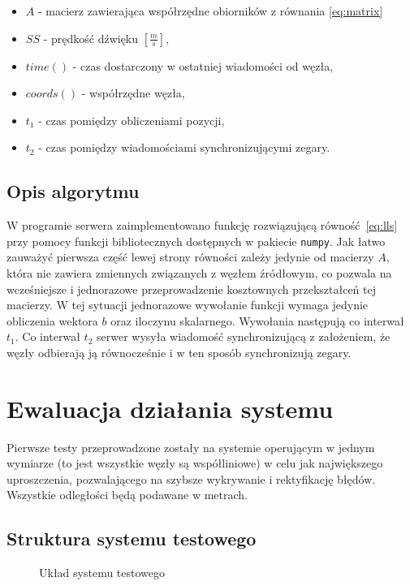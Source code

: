 \begin{itemize}
    \item $A$ - macierz zawierająca współrzędne obiorników z równania \ref{eq:matrix}
    \item $SS$ {-} prędkość dźwięku $\left[\frac{m}{s}\right]$,
    \item $time()$ {-} czas dostarczony w ostatniej wiadomości od węzła,
    \item $coords()$ {-} współrzędne węzła,
    \item $t_1$ {-} czas pomiędzy obliczeniami pozycji,
    \item $t_2$ {-} czas pomiędzy wiadomościami synchronizującymi zegary.
\end{itemize}

\subsection{Opis algorytmu}

W programie serwera zaimplementowano funkcję rozwiązującą równość~\ref{eq:lls} przy pomocy funkcji bibliotecznych dostępnych w pakiecie \texttt{numpy}. Jak łatwo zauważyć pierwsza część lewej strony równości zależy jedynie od macierzy $A$, która nie zawiera zmiennych związanych z węzłem źródłowym, co pozwala na wcześniejsze i jednorazowe przeprowadzenie kosztownych przekształceń tej macierzy. W tej sytuacji jednorazowe wywołanie funkcji wymaga jedynie obliczenia wektora $b$ oraz iloczynu skalarnego. Wywołania następują co interwał $t_1$. Co interwał $t_2$ serwer wysyła wiadomość synchronizującą z założeniem, że węzły odbierają ją równocześnie i w ten sposób synchronizują zegary.

\section{Ewaluacja działania systemu}

Pierwsze testy przeprowadzone zostały na systemie operującym w jednym wymiarze (to jest wszystkie węzły są współliniowe) w celu jak największego uproszczenia, pozwalającego na szybsze wykrywanie i rektyfikację błędów. Wszystkie odległości będą podawane w metrach.

\subsection{Struktura systemu testowego}

\begin{figure}[h]
    \centering
    \caption{Układ systemu testowego}
\label{fig:test_setup}
\end{figure}

